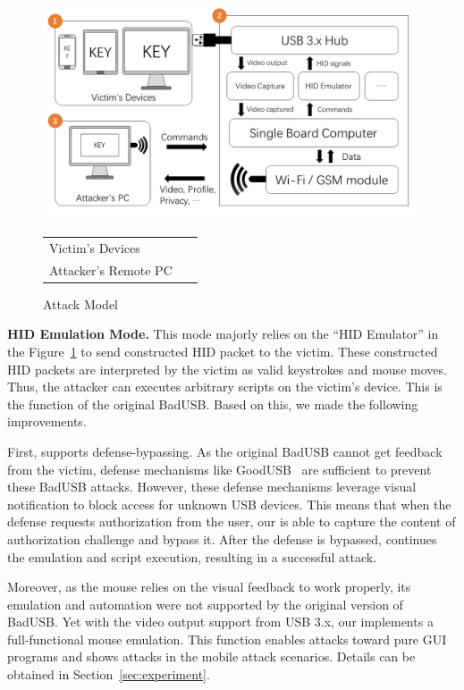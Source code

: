 \begin{figure}[t]
	\centering
	\includegraphics[width=\linewidth]{./Figs/attack_model.png}

	\begin{tabular}{ll}
	\circled[text=white,fill=myyellow]{\footnotesize{1}} Victim's Devices    &\circled[text=white,fill=myyellow]{\footnotesize{2}}~\tool\\
	\circled[text=white,fill=myyellow]{\footnotesize{3}} Attacker's Remote PC
	\end{tabular}

	\caption{Attack Model}%
	\label{fig:attack_model}
\end{figure}

\textbf{HID Emulation Mode.} This mode majorly relies on the ``HID Emulator'' in the Figure~\ref{fig:attack_model} to
send constructed HID packet to the victim. These constructed HID packets are
interpreted by the victim as valid keystrokes and mouse moves. Thus, the
attacker can executes arbitrary scripts on the victim's device. This is the
function of the original BadUSB. Based on this, we made the following
improvements.

First, \tool supports defense-bypassing. As the original BadUSB cannot get
feedback from the victim, defense mechanisms like GoodUSB~\cite{tian2015defending} are sufficient to prevent these BadUSB attacks.
However, these defense mechanisms leverage visual notification to block access
for unknown USB devices. This means that when the defense requests authorization
from the user, our \tool is able to capture the content of authorization
challenge and bypass it. After the defense is bypassed, \tool continues the
emulation and script execution, resulting in a successful attack.

Moreover, as the mouse relies on the visual feedback to work properly, its
emulation and automation were not supported by the original version of BadUSB.
Yet with the video output support from USB 3.x, our \tool implements a
full-functional mouse emulation. This function enables attacks toward pure GUI
programs and shows attacks in the mobile attack scenarios. Details can
be obtained in Section~\ref{sec:experiment}.

